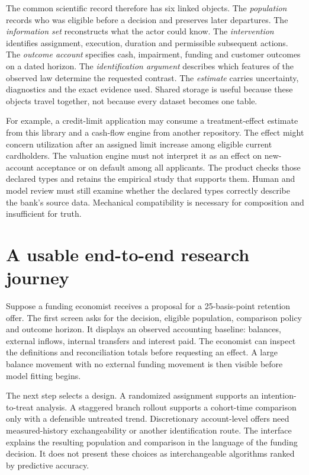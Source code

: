 The common scientific record therefore has six linked objects. The
\emph{population} records who was eligible before a decision and preserves
later departures. The \emph{information set} reconstructs what the actor
could know. The \emph{intervention} identifies assignment, execution,
duration and permissible subsequent actions. The \emph{outcome account}
specifies cash, impairment, funding and customer outcomes on a dated horizon.
The \emph{identification argument} describes which features of the observed
law determine the requested contrast. The \emph{estimate} carries uncertainty,
diagnostics and the exact evidence used. Shared storage is useful because
these objects travel together, not because every dataset becomes one table.

For example, a credit-limit application may consume a treatment-effect
estimate from this library and a cash-flow engine from another repository.
The effect might concern utilization after an assigned limit increase among
eligible current cardholders. The valuation engine must not interpret it as
an effect on new-account acceptance or on default among all applicants.
The product checks those declared types and retains the empirical study that
supports them. Human and model review must still examine whether the declared
types correctly describe the bank's source data. Mechanical compatibility
is necessary for composition and insufficient for truth.

\section{A usable end-to-end research journey}
Suppose a funding economist receives a proposal for a 25-basis-point retention
offer. The first screen asks for the decision, eligible population, comparison
policy and outcome horizon. It displays an observed accounting baseline:
balances, external inflows, internal transfers and interest paid. The economist
can inspect the definitions and reconciliation totals before requesting an
effect. A large balance movement with no external funding movement is then
visible before model fitting begins.

The next step selects a design. A randomized assignment supports an intention-
to-treat analysis. A staggered branch rollout supports a cohort-time comparison
only with a defensible untreated trend. Discretionary account-level offers
need measured-history exchangeability or another identification route.
The interface explains the resulting population and comparison in the
language of the funding decision. It does not present these choices as
interchangeable algorithms ranked by predictive accuracy.


